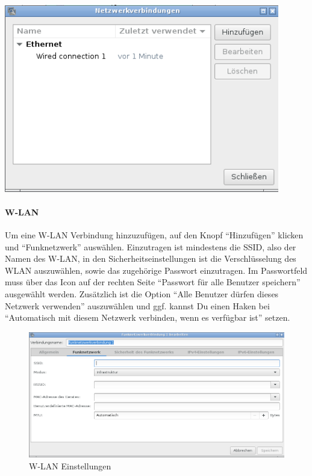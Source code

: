 \documentclass[a4paper,12pt,twoside]{article}
\begin{document}
\bigskip
\begin{minipage}{\linewidth}
    \centering
    \includegraphics[width=12cm]{screenshots/network_manager.png}
    \label{fig:dialog_netzwerk}
\end{minipage}


\paragraph{W-LAN}
\label{sct:wifi}
Um eine W-LAN Verbindung hinzuzufügen, auf den Knopf "`Hinzufügen"' klicken
und "`Funknetzwerk"' auswählen. Einzutragen ist
mindestens die SSID, also der Namen des W-LAN, in den
Sicherheitseinstellungen ist die Verschlüsselung des WLAN auszuwählen,
sowie das zugehörige Passwort einzutragen. Im Passwortfeld muss über das 
Icon auf der rechten Seite "`Passwort für alle Benutzer speichern"' 
ausgewählt werden. Zusätzlich ist die Option "`Alle Benutzer dürfen 
dieses Netzwerk verwenden"' auszuwählen und ggf. kannst Du einen
Haken bei "`Automatisch mit diesem Netzwerk verbinden, wenn es 
verfügbar ist"' setzen.

\begin{figure}
    \centering
    \includegraphics[width=13cm]{screenshots/network_manager_wifi.png}
    \caption{W-LAN Einstellungen}
    \label{fig:wifi}
\end{figure}
\end{document}
